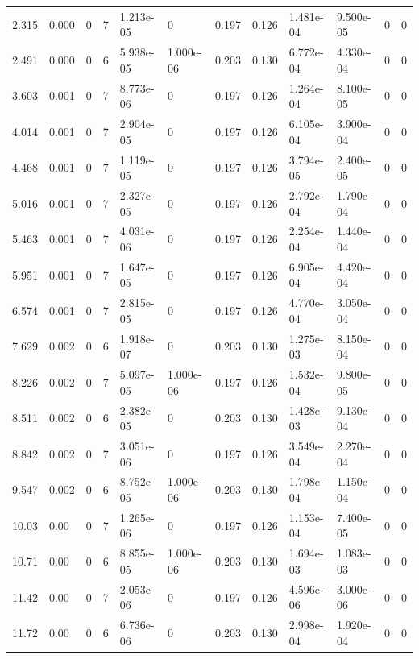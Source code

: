 \documentclass[preview]{standalone}
\begin{document}
{{\begin{tabular}{L{1.2cm}C{1.2cm} C{0.3cm}C{0.5cm} C{1.4cm}C{1.4cm} C{1.4cm}C{1.4cm} C{1.6cm}C{1.6cm} C{1.6cm}C{1.6cm}}
  2.315  &  0.000  & 0     &  7 &  1.213e-05  & 0  &  0.197&   0.126& 1.481e-04 & 9.500e-05   &  0 & 0  \\ 
  2.491  &  0.000  & 0     &  6 &  5.938e-05  & 1.000e-06  &  0.203&   0.130& 6.772e-04 & 4.330e-04   &  0 & 0  \\ 
  3.603  &  0.001  & 0     &  7 &  8.773e-06  & 0  &  0.197&   0.126& 1.264e-04 & 8.100e-05   &  0 & 0  \\ 
  4.014  &  0.001  & 0     &  7 &  2.904e-05  & 0  &  0.197&   0.126& 6.105e-04 & 3.900e-04   &  0 & 0  \\ 
  4.468  &  0.001  & 0     &  7 &  1.119e-05  & 0  &  0.197&   0.126& 3.794e-05 & 2.400e-05   &  0 & 0  \\ 
  5.016  &  0.001  & 0     &  7 &  2.327e-05  & 0  &  0.197&   0.126& 2.792e-04 & 1.790e-04   &  0 & 0  \\ 
  5.463  &  0.001  & 0     &  7 &  4.031e-06  & 0  &  0.197&   0.126& 2.254e-04 & 1.440e-04   &  0 & 0  \\ 
  5.951  &  0.001  & 0     &  7 &  1.647e-05  & 0  &  0.197&   0.126& 6.905e-04 & 4.420e-04   &  0 & 0  \\ 
  6.574  &  0.001  & 0     &  7 &  2.815e-05  & 0  &  0.197&   0.126& 4.770e-04 & 3.050e-04   &  0 & 0  \\ 
  7.629  &  0.002  & 0     &  6 &  1.918e-07  & 0  &  0.203&   0.130& 1.275e-03 & 8.150e-04   &  0 & 0  \\ 
  8.226  &  0.002  & 0     &  7 &  5.097e-05  & 1.000e-06  &  0.197&   0.126& 1.532e-04 & 9.800e-05   &  0 & 0  \\ 
  8.511  &  0.002  & 0     &  6 &  2.382e-05  & 0  &  0.203&   0.130& 1.428e-03 & 9.130e-04   &  0 & 0  \\ 
  8.842  &  0.002  & 0     &  7 &  3.051e-06  & 0  &  0.197&   0.126& 3.549e-04 & 2.270e-04   &  0 & 0  \\ 
  9.547  &  0.002  & 0     &  6 &  8.752e-05  & 1.000e-06  &  0.203&   0.130& 1.798e-04 & 1.150e-04   &  0 & 0  \\ 
  10.03  &  0.00  & 0     &  7 &  1.265e-06  & 0  &  0.197&   0.126& 1.153e-04 & 7.400e-05   &  0 & 0  \\ 
  10.71  &  0.00  & 0     &  6 &  8.855e-05  & 1.000e-06  &  0.203&   0.130& 1.694e-03 & 1.083e-03   &  0 & 0  \\ 
  11.42  &  0.00  & 0     &  7 &  2.053e-06  & 0  &  0.197&   0.126& 4.596e-06 & 3.000e-06   &  0 & 0  \\ 
  11.72  &  0.00  & 0     &  6 &  6.736e-06  & 0  &  0.203&   0.130& 2.998e-04 & 1.920e-04   &  0 & 0  \\ 

\end{tabular}}}
\end{document}
